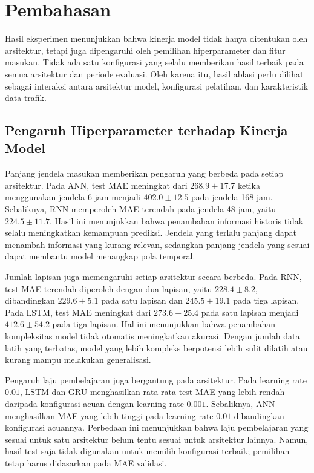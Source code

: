 \documentclass[conference,a4paper]{IEEEtran}
\begin{document}

\section{Pembahasan}

Hasil eksperimen menunjukkan bahwa kinerja model tidak hanya
ditentukan oleh arsitektur, tetapi juga dipengaruhi oleh
pemilihan hiperparameter dan fitur masukan. Tidak ada satu
konfigurasi yang selalu memberikan hasil terbaik pada semua
arsitektur dan periode evaluasi. Oleh karena itu, hasil ablasi
perlu dilihat sebagai interaksi antara arsitektur model,
konfigurasi pelatihan, dan karakteristik data trafik.

\subsection{Pengaruh Hiperparameter terhadap Kinerja Model}

Panjang jendela masukan memberikan pengaruh yang berbeda
pada setiap arsitektur. Pada ANN, test MAE meningkat dari
$268.9 \pm 17.7$ ketika menggunakan jendela 6 jam menjadi
$402.0 \pm 12.5$ pada jendela 168 jam. Sebaliknya, RNN
memperoleh MAE terendah pada jendela 48 jam, yaitu
$224.5 \pm 11.7$. Hasil ini menunjukkan bahwa penambahan
informasi historis tidak selalu meningkatkan kemampuan
prediksi. Jendela yang terlalu panjang dapat menambah
informasi yang kurang relevan, sedangkan panjang jendela
yang sesuai dapat membantu model menangkap pola temporal.

Jumlah lapisan juga memengaruhi setiap arsitektur secara
berbeda. Pada RNN, test MAE terendah diperoleh dengan dua
lapisan, yaitu $228.4 \pm 8.2$, dibandingkan
$229.6 \pm 5.1$ pada satu lapisan dan $245.5 \pm 19.1$
pada tiga lapisan. Pada LSTM, test MAE meningkat dari
$273.6 \pm 25.4$ pada satu lapisan menjadi
$412.6 \pm 54.2$ pada tiga lapisan. Hal ini menunjukkan
bahwa penambahan kompleksitas model tidak otomatis
meningkatkan akurasi. Dengan jumlah data latih yang terbatas,
model yang lebih kompleks berpotensi lebih sulit dilatih
atau kurang mampu melakukan generalisasi.

Pengaruh laju pembelajaran juga bergantung pada arsitektur.
Pada learning rate $0.01$, LSTM dan GRU menghasilkan
rata-rata test MAE yang lebih rendah daripada konfigurasi
acuan dengan learning rate $0.001$. Sebaliknya, ANN
menghasilkan MAE yang lebih tinggi pada learning rate
$0.01$ dibandingkan konfigurasi acuannya. Perbedaan ini
menunjukkan bahwa laju pembelajaran yang sesuai untuk satu
arsitektur belum tentu sesuai untuk arsitektur lainnya.
Namun, hasil test saja tidak digunakan untuk memilih
konfigurasi terbaik; pemilihan tetap harus didasarkan pada
MAE validasi.
\end{document}
